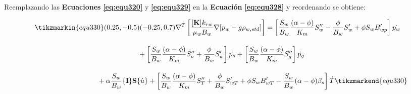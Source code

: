 \bigskip
Reemplazando las \textbf{Ecuaciones} \textbf{\ref{eq:equ320}} y \textbf{\ref{eq:equ329}} en la \textbf{Ecuación} \textbf{\ref{eq:equ328}} y reordenando se obtiene:

\begin{ceqn} 
\label{eq:equ330} 
\begin{gather}
\begin{multlined}
\tikzmarkin{equ330}(0.25,-0.5)(-0.25,0.7)
\nabla^T \left[ \frac{[\mathbf{K}] k_{rw}}{\mu_{w}B_{w}} \nabla[p_w - g\rho_{w,std}] \right] =
\left[\frac{S_w}{B_w} \frac{(\alpha - \phi)}{K_m}S''_w - \frac{\phi}{B_w} S'_w + \phi S_w B'_{wp}   \right]\dot{p_w}\\[10pt] 
+ \left[\frac{S_w}{B_w} \frac{(\alpha - \phi)}{K_m}S''_o + \frac{\phi}{B_w} S'_w\right]\dot{p_o} + \left[\frac{S_w}{B_w} \frac{(\alpha - \phi)}{K_m}S''_g \right]\dot{p_g}  \\[10pt]
+ \alpha \frac{S_w}{B_w}\{\mathbf{I}\}\mathbf{S}\{\dot{u}\} + \left[ \frac{S_w}{B_w}\frac{(\alpha - \phi)}{K_m}S''_{T} + \frac{\phi}{B_w} S'_{wT} + \phi S_w B'_{wT} - \frac{S_w}{B_w}(\alpha - \phi)\beta_s  \right]\dot{T}
\tikzmarkend{equ330} \label{eq:equ330a}
\end{multlined}
\end{gather}  
\end{ceqn}




